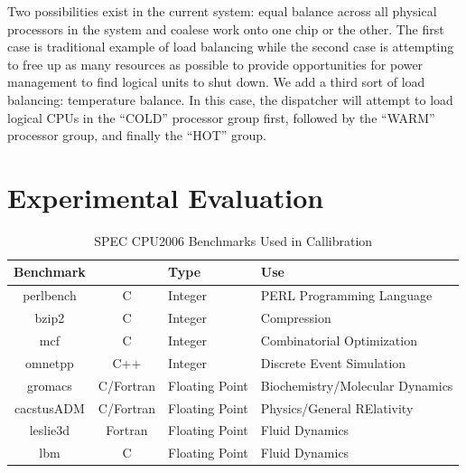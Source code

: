 \documentclass[times,10pt,onecolumn]{article}
\begin{document}
Two possibilities exist in the current system: equal balance across all
physical processors in the system and coalese work onto one chip or the
other.  The first case is traditional example of load balancing while
the second case is attempting to free up as many resources as possible
to provide opportunities for power management to find logical units to
shut down.   We add a third sort of load balancing: temperature
balance. In this case, the dispatcher will attempt to load logical CPUs
in the ``COLD'' processor group first, followed by the ``WARM''
processor group, and finally the ``HOT'' group.


\section{Experimental Evaluation}
\label{sec:experiment}

\begin{table}
  \centering
  \caption{SPEC CPU2006 Benchmarks Used in Callibration}
  \label{tab:specbenchs}
  \begin{tabular}{c c l l}
    \hline
    Benchmark& &Type&Use\\
    \hline
    perlbench&C&Integer&PERL Programming Language\\
    bzip2&C&Integer&Compression\\
    mcf&C&Integer&Combinatorial Optimization\\
    omnetpp&C++&Integer&Discrete Event Simulation\\
    \hline
    gromacs&C/Fortran&Floating Point&Biochemistry/Molecular Dynamics\\
    cacstusADM&C/Fortran&Floating Point&Physics/General RElativity\\
    leslie3d&Fortran&Floating Point&Fluid Dynamics\\
    lbm&C&Floating Point&Fluid Dynamics\\
    \hline \hline
  \end{tabular}
\end{table}
\end{document}
